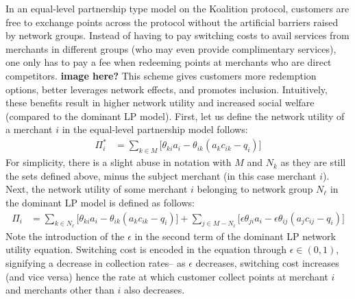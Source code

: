 In an equal-level partnership type model on the Koalition protocol, customers are free to exchange points across the protocol without the artificial barriers raised by network groups. Instead of having to pay switching costs to avail services from merchants in different groups (who may even provide complimentary services), one only has to pay a fee when redeeming points at merchants who are direct competitors. \textbf{image here?} This scheme gives customers more redemption options, better leverages network effects, and promotes inclusion. Intuitively, these benefits result in higher network utility and increased social welfare (compared to the dominant LP model). First, let us define the network utility of a merchant $i$ in the equal-level partnership model follows:
%
\begin{align*}
\Pi_i^* & = \sum_{k \in M} \big[\theta_{ki}a_i - \theta_{ik}(a_k c_{ik} - q_i) \big]
\end{align*}
%
For simplicity, there is a slight abuse in notation with $M$ and $N_k$ as they are still the sets defined above, minus the subject merchant (in this case merchant $i$).  Next, the network utility of some merchant $i$ belonging to network group $N_\ell$ in the dominant LP model is defined as follows:
%
\begin{align*}
\Pi_i & = \sum_{k \in N_\ell} \big[\theta_{ki}a_i - \theta_{ik}(a_k c_{ik} - q_i) \big] + \sum_{j \in M - N_\ell} \big[\epsilon \theta_{ji}a_i - \epsilon \theta_{ij}(a_j  c_{ij} - q_i) \big]
\end{align*}
%
Note the introduction of the $\epsilon$ in the second term of the dominant LP network utility equation. Switching cost is encoded in the equation through $\epsilon \in (0,1)$, signifying a decrease in collection rates-- as $\epsilon$ decreases, switching cost increases (and vice versa) hence the rate at which customer collect points at merchant $i$ and merchants other than $i$ also decreases. 

